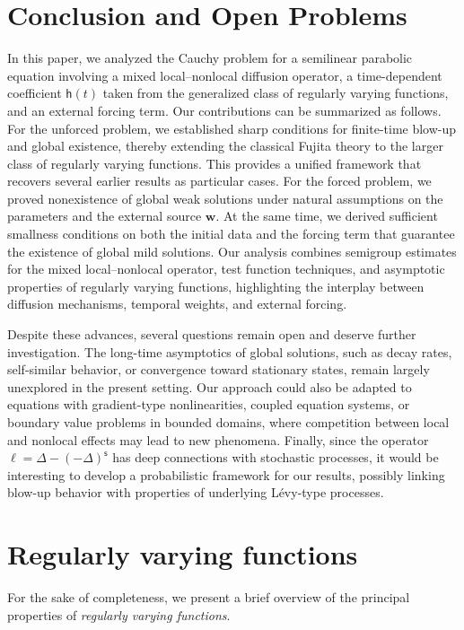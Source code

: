 \documentclass[12pt,reqno]{amsart}
\theoremstyle{plain}
\theoremstyle{definition}
\theoremstyle{remark}
\numberwithin{equation}{section}
\renewcommand{\L}{\ell}
\newcommand{\h}{\mathsf h}
\newcommand{\bw}{\mathbf{w}}
\newcommand{\ts}{\mathsf{s}}
\begin{document}
\section{Conclusion and Open Problems}
\label{Conc-sec}
In this paper, we analyzed the Cauchy problem for a semilinear parabolic equation involving a 
mixed local–nonlocal diffusion operator, a time-dependent coefficient $\h(t)$ taken from the 
generalized class of regularly varying functions, and an external forcing term. Our contributions can be summarized as follows. For the unforced problem, we established sharp conditions for finite-time blow-up and global existence, thereby extending the classical Fujita theory to the larger class of regularly varying functions. This provides a unified framework that recovers several earlier results as particular cases. For the forced problem, we proved nonexistence  of global weak solutions under natural assumptions on the parameters and the external source $\bw$. At the same time, we derived sufficient smallness conditions on both the initial data and the forcing term that guarantee the existence of global mild solutions. Our analysis combines semigroup estimates for the mixed local–nonlocal operator, test function techniques, and asymptotic properties of regularly varying functions, highlighting the interplay between diffusion mechanisms, temporal weights, and external forcing.

Despite these advances, several questions remain open and deserve further investigation. The long-time asymptotics of global solutions, such as decay rates, self-similar behavior, or convergence toward stationary states, remain largely unexplored in the present setting. Our approach could also be adapted to equations with gradient-type nonlinearities, coupled equation systems, or boundary value problems in bounded domains, where competition between local and nonlocal effects may lead to new phenomena. Finally, since the operator $\L=\Delta-(-\Delta)^\ts$ has deep connections with stochastic processes, it would be interesting to develop a probabilistic framework for our results, possibly linking blow-up behavior with properties of underlying Lévy-type processes.




\appendix \section{Regularly varying functions} \label{appendix1}
For the sake of completeness, we present a brief overview of the principal properties of \emph{regularly varying functions}.
\end{document}
